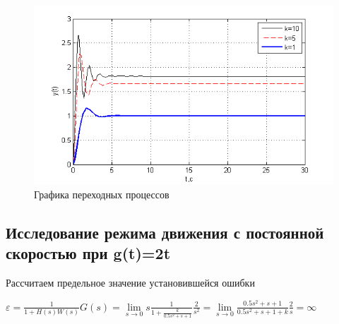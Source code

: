 \documentclass[a4paper, 11pt]{article}
\begin{document}
\begin{figure}[h]
	\centering
	\includegraphics[width=0.7\linewidth]{2}
	\caption{Графика переходных процессов}
	\label{fig:2}
\end{figure}

\subsection{Исследование режима движения с постоянной скоростью при g(t)=2t}
Рассчитаем предельное значение установившейся ошибки

\vspace{0.5cm}
$\varepsilon  = \frac{1}{{1 + H\left( s \right)W\left( s \right)}}G\left( s \right) = \mathop {\lim }\limits_{s \to 0} s\frac{1}{{1 + \frac{k}{{0.5{s^2} + s + 1}}}}\frac{2}{{{s^2}}} = \mathop {\lim }\limits_{s \to 0} \frac{{0.5{s^2} + s + 1}}{{0.5{s^2} + s + 1 + k}}\frac{2}{s} = \infty $
\end{document}
